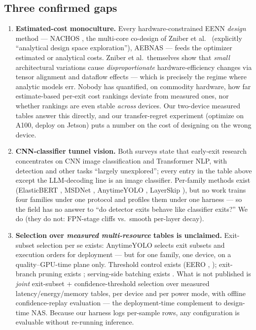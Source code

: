 \documentclass[11pt]{article}
\begin{document}
\subsection{Three confirmed gaps}

\begin{enumerate}
\item \textbf{Estimated-cost monoculture.} Every hardware-constrained EENN
\emph{design} method --- NACHOS \citep{nachos2024}, the multi-core co-design of
Zniber et al.\ \citep{zniber2025} (explicitly ``analytical design space
exploration''), AEBNAS \citep{aebnas2025} --- feeds the optimizer estimated or
analytical costs. Zniber et al.\ themselves show that \emph{small} architectural
variations cause \emph{disproportionate} hardware-efficiency changes via tensor
alignment and dataflow effects --- which is precisely the regime where analytic
models err. Nobody has quantified, on commodity hardware, how far
estimate-based per-exit cost rankings deviate from measured ones, nor whether
rankings are even stable \emph{across} devices. Our two-device measured tables
answer this directly, and our transfer-regret experiment (optimize on A100,
deploy on Jetson) puts a number on the cost of designing on the wrong device.
\item \textbf{CNN-classifier tunnel vision.} Both surveys
\citep{laskaridis2021adaptive, csur2024survey} state that early-exit research
concentrates on CNN image classification and Transformer NLP, with detection
and other tasks ``largely unexplored''; every entry in the table above except
the LLM-decoding line is an image classifier. Per-family methods exist
(ElasticBERT \citep{elasticbert2022}, MSDNet \citep{msdnet2018}, AnytimeYOLO
\citep{anytimeyolo2025}, LayerSkip \citep{layerskip2024}), but no work trains
four families under one protocol and profiles them under one harness --- so
the field has no answer to ``do detector exits behave like classifier
exits?'' We do (they do not: FPN-stage cliffs vs.\ smooth per-layer decay).
\item \textbf{Selection over \emph{measured multi-resource} tables is
unclaimed.} Exit-subset selection per se exists: AnytimeYOLO
\citep{anytimeyolo2025} selects exit subsets and execution orders for
deployment --- but for one family, one device, on a quality--GPU-time plane
only. Threshold control exists (EERO \citep{eero2024},
\citep{performancecontrol2024}); exit-branch pruning exists \citep{prunee2022};
serving-side batching exists \citep{drex2025}. What is not published is
\emph{joint} exit-subset + confidence-threshold selection over measured
latency/energy/memory tables, per device and per power mode, with offline
confidence-replay evaluation --- the deployment-time complement to design-time
NAS. Because our harness logs per-sample rows, any configuration is evaluable
without re-running inference.
\end{enumerate}
\end{document}
